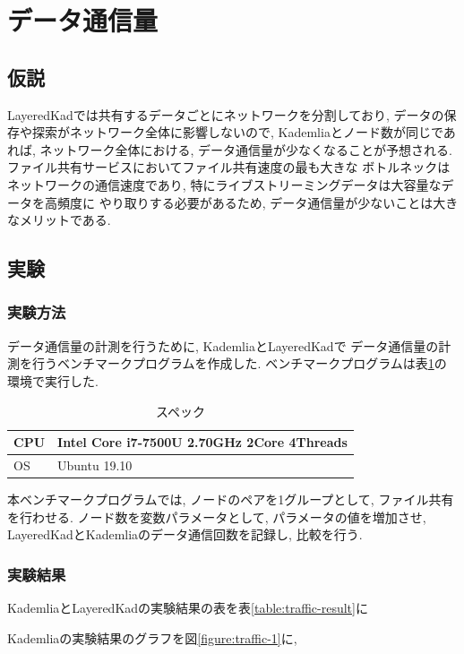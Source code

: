 \documentclass[sotsuron]{jcsie}
\begin{document}
\section{データ通信量}
\subsection{仮説}
LayeredKadでは共有するデータごとにネットワークを分割しており, 
データの保存や探索がネットワーク全体に影響しないので, 
Kademliaとノード数が同じであれば, ネットワーク全体における, 
データ通信量が少なくなることが予想される.
ファイル共有サービスにおいてファイル共有速度の最も大きな
ボトルネックはネットワークの通信速度であり, 
特にライブストリーミングデータは大容量なデータを高頻度に
やり取りする必要があるため, 
データ通信量が少ないことは大きなメリットである.

\subsection{実験}
\subsubsection{実験方法}
データ通信量の計測を行うために, KademliaとLayeredKadで
データ通信量の計測を行うベンチマークプログラムを作成した.
ベンチマークプログラムは表\ref{table:spec-note}の環境で実行した.

\begin{table}[H]
	\caption{スペック}	
	\centering
	\label{table:spec-note}
	\begin{tabular}{|l|l|}
		\hline
		CPU &   
		Intel Core i7-7500U 2.70GHz 2Core 4Threads\\ 
		\hline	
		OS  &   
		Ubuntu 19.10 \\ 
		\hline
	\end{tabular}	
\end{table}

本ベンチマークプログラムでは, ノードのペアを1グループとして, 
ファイル共有を行わせる.
ノード数を変数パラメータとして, パラメータの値を増加させ, 
LayeredKadとKademliaのデータ通信回数を記録し, 比較を行う.

\subsubsection{実験結果}
KademliaとLayeredKadの実験結果の表を表\ref{table:traffic-result}に

Kademliaの実験結果のグラフを図\ref{figure:traffic-1}に, 
\end{document}

